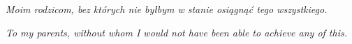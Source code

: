 
\begin{dedication} 

\emph{Moim rodzicom, bez których nie byłbym w stanie osiągnąć tego
  wszystkiego.}

\emph{To my parents, without whom I would not have been able to achieve
  any of this.}
  
\end{dedication}

